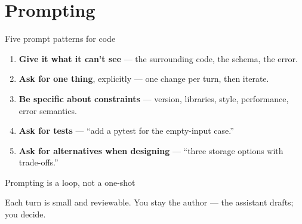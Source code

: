 \documentclass[aspectratio=169,11pt]{beamer}
\begin{document}
\section{Prompting}
\begin{frame}{Five prompt patterns for code}
  \begin{enumerate}
    \item \textbf{Give it what it can't see} --- the surrounding code, the schema, the error.
    \item \textbf{Ask for one thing}, explicitly --- one change per turn, then iterate.
    \item \textbf{Be specific about constraints} --- version, libraries, style, performance, error semantics.
    \item \textbf{Ask for tests} --- ``add a pytest for the empty-input case.''
    \item \textbf{Ask for alternatives when designing} --- ``three storage options with trade-offs.''
  \end{enumerate}
\end{frame}

\begin{frame}{Prompting is a loop, not a one-shot}
  \begin{center}
  \end{center}
  {\footnotesize Each turn is small and reviewable. You stay the author --- the assistant drafts; you decide.}
\end{frame}

\end{document}
